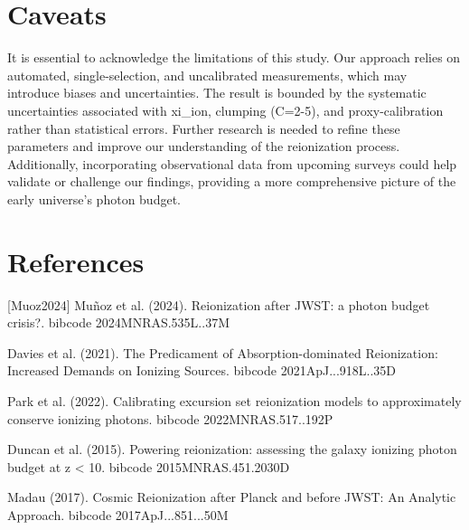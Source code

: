 \documentclass[twocolumn]{aastex631}
\begin{document}
\section{Caveats}
It is essential to acknowledge the limitations of this study. Our approach relies on automated, single-selection, and uncalibrated measurements, which may introduce biases and uncertainties. The result is bounded by the systematic uncertainties associated with xi\_ion, clumping (C=2-5), and proxy-calibration rather than statistical errors. Further research is needed to refine these parameters and improve our understanding of the reionization process. Additionally, incorporating observational data from upcoming surveys could help validate or challenge our findings, providing a more comprehensive picture of the early universe's photon budget.
\section*{References}
\footnotesize
[Muoz2024] Muñoz et al. (2024). Reionization after JWST: a photon budget crisis?. bibcode 2024MNRAS.535L..37M \par [Davies2021] Davies et al. (2021). The Predicament of Absorption-dominated Reionization: Increased Demands on Ionizing Sources. bibcode 2021ApJ...918L..35D \par [Park2022] Park et al. (2022). Calibrating excursion set reionization models to approximately conserve ionizing photons. bibcode 2022MNRAS.517..192P \par [Duncan2015] Duncan et al. (2015). Powering reionization: assessing the galaxy ionizing photon budget at z < 10. bibcode 2015MNRAS.451.2030D \par [Madau2017] Madau (2017). Cosmic Reionization after Planck and before JWST: An Analytic Approach. bibcode 2017ApJ...851...50M
\end{document}
